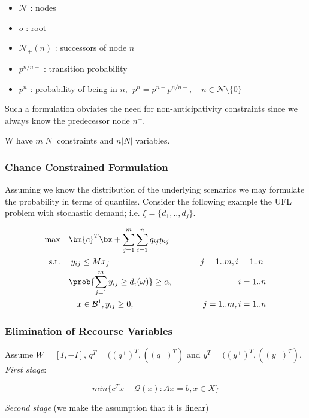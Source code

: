 \begin{itemize}
\item $\mathcal{N}$ : nodes
\item $o$ : root
\item $\mathcal{N}_+(n)$ : successors of node $n$
\item $p^{n/n-}$ : transition probability
\item $p^n$ : probability of being in $n$, $\; p^n = p^{n-} p^{n/n-}, \quad n \in \mathcal{N} \setminus \{0\}$ 
\end{itemize}

Such a formulation obviates the need for non-anticipativity constraints since we always know the predecessor
node $n^-$.

W have $m|N|$ constraints and $n|N|$ variables.

\subsubsection{Chance Constrained Formulation}

Assuming we know the distribution of the underlying scenarios we may formulate the
probability in terms of quantiles. Consider the following example the UFL problem with
stochastic demand; i.e. $\xi = \{d_1, .., d_j\}$.

\begin{alignat*}{2}
\textrm{max} & \quad \bm{c}^T \bx + \sum_{j=1}^m \sum_{i=1}^n q_{ij} y_{ij}\ & \ \\
\text{s.t.}  & \quad\; y_{ij} \leq M x_j \ & \quad \quad j = 1..m, i = 1..n\ \\
             & \quad \prob{\sum_{j=1}^m y_{ij} \geq d_i(\omega)} \geq \alpha_i \ & \quad \quad i=1..n \\
             & \quad \quad x \in \mathcal{B}^1, y_{ij} \geq 0, \ & \quad \quad j = 1..m, i = 1..n
\end{alignat*}

\subsubsection{Elimination of Recourse Variables}

Assume $W = [I,-I]$, $q^T = ((q^+)^T, ((q^-)^T)$ and $y^T = ((y^+)^T, ((y^-)^T)$.\\

{\it First stage}:

\[
min \{ c^T x + \mathcal{Q}(x) : Ax=b, x\in X\}
\]

{\it Second stage} (we make the assumption that it is linear)


